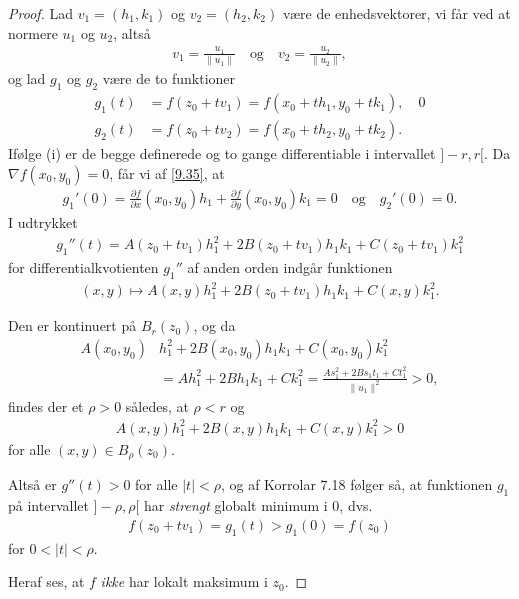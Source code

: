 \begin{proof}
  Lad $v_1 = (h_1, k_1)$ og $v_2 = (h_2, k_2)$ være de enhedsvektorer, vi får ved at normere $u_1$ og $u_2$, altså
  \begin{align*}
    v_1 = \frac{u_1}{\| u_1 \|} \quad \text{og} \quad v_2 = \frac{u_2}{\| u_2 \|},
  \end{align*}
  og lad $g_1$ og $g_2$ være de to funktioner
  \begin{align*}
    g_1(t) &= f(z_0 + tv_1) = f(x_0 + th_1, y_0 + tk_1), \quad \text{0}\\
    g_2(t) &= f(z_0 + tv_2) = f(x_0 + th_2, y_0 + tk_2).
  \end{align*}
  Ifølge (i) er de begge definerede og to gange differentiable i intervallet $]-r,r[$. Da $\nabla f(x_0, y_0) = 0$, får vi af \eqref{9.35}, at
  \begin{align*}
    g_1'(0) = \frac{\partial f}{\partial x}(x_0, y_0)h_1 + \frac{\partial f}{\partial y}(x_0, y_0)k_1 = 0 \quad \text{og} \quad g_2'(0) = 0.
  \end{align*}
  I udtrykket
  \begin{align*}
    g_1''(t) = A(z_0 + tv_1)h_1^2 + 2B(z_0 + tv_1)h_1k_1 + C(z_0 + tv_1)k_1^2
  \end{align*}
  for differentialkvotienten $g_1''$ af anden orden indgår funktionen
  \begin{align*}
    (x,y) \mapsto A(x,y)h_1^2 + 2B(z_0 + tv_1)h_1k_1 + C(x,y)k_1^2.
  \end{align*}

  Den er kontinuert på $B_r(z_0)$, og da
  \begin{align*}
    A(x_0, y_0)&h_1^2 + 2B(x_0, y_0)h_1k_1 + C(x_0, y_0)k_1^2\\
    &= Ah_1^2 + 2Bh_1k_1 + C k_1^2 = \frac{As_1^2 + 2Bs_1t_1 + Ct_1^2}{\| u_1 \|^2}>0,
  \end{align*}
  findes der et $\rho > 0$ således, at $\rho < r$ og
  \begin{align*}
    A(x,y)h_1^2 + 2B(x,y)h_1k_1 + C(x,y)k_1^2 > 0
  \end{align*}
  for alle $(x,y) \in B_\rho (z_0)$.

  Altså er $g''(t) > 0$ for alle $|t| < \rho$, og af Korrolar 7.18 følger så, at funktionen $g_1$ på intervallet $]-\rho, \rho[$ har \textit{strengt} globalt minimum i 0, dvs.
  \begin{align*}
    f(z_0 + tv_1) = g_1(t) > g_1(0) = f(z_0)
  \end{align*}
  for $0 < |t| < \rho$.

  Heraf ses, at $f$ \textit{ikke} har lokalt maksimum i $z_0$.


\end{proof}
